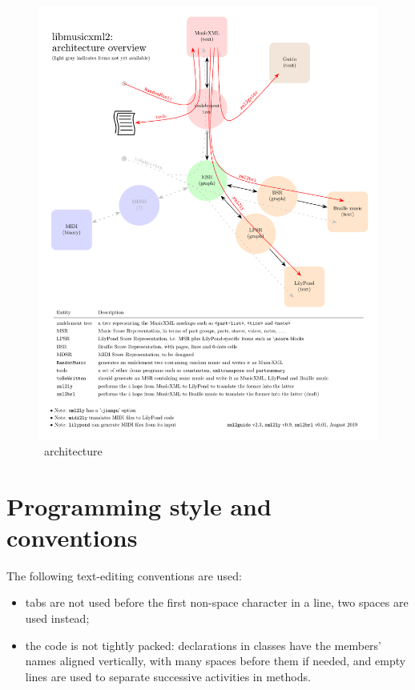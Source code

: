 \documentclass[12pt,a4paper]{article}
\begin{document}
\begin{figure}
\caption{\lib\ architecture}\label{libmusicxmlArchitecture}
\includegraphics[scale=0.8]{../libmusicxmlArchitecture/libmusicxmlArchitecture.pdf}
\end{figure}


\section{Programming style and conventions}

The following text-editing conventions are used:
\begin{itemize}
\item tabs are not used before the first non-space character in a line, two spaces are used instead;

\item the code is not tightly packed: declarations in classes have the members' names aligned vertically, with many spaces before them if needed, and empty lines are used to separate successive activities in methods.
\end{itemize}
\end{document}
